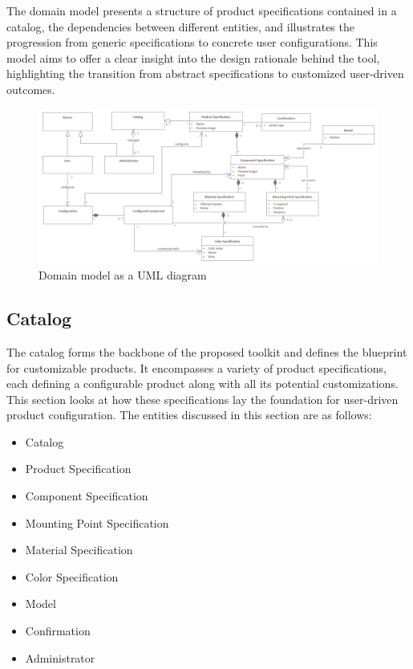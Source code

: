 The domain model presents a structure of product specifications contained in a catalog, the dependencies between different entities, and illustrates the progression from generic specifications to concrete user configurations. This model aims to offer a clear insight into the design rationale behind the tool, highlighting the transition from abstract specifications to customized user-driven outcomes.

\begin{landscape}
\begin{figure}
\centering
\includegraphics[width=\linewidth]{images/uml_domainmodel.png}
\caption{Domain model as a UML diagram}
\label{fig:domain-model}
\end{figure}
\end{landscape}

\subsection{Catalog}

The catalog forms the backbone of the proposed toolkit and defines the blueprint for customizable products. It encompasses a variety of product specifications, each defining a configurable product along with all its potential customizations. This section looks at how these specifications lay the foundation for user-driven product configuration.
The entities discussed in this section are as follows:
\begin{itemize}[label=\rectanglebullet]
    \item Catalog
    \item Product Specification
    \item Component Specification
    \item Mounting Point Specification
    \item Material Specification
    \item Color Specification
    \item Model
    \item Confirmation
    \item Administrator
\end{itemize}

